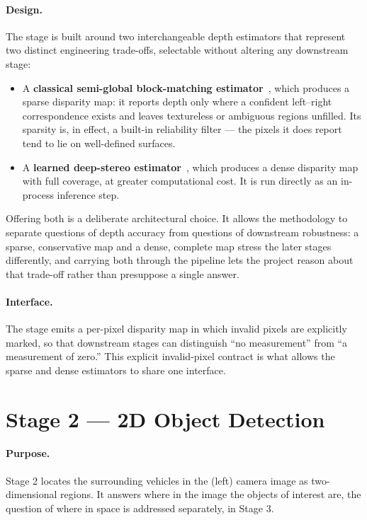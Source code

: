 \paragraph{Design.} The stage is built around two interchangeable depth estimators
that represent two distinct engineering trade-offs, selectable without altering any
downstream stage:

\begin{itemize}[leftmargin=*,itemsep=3pt]
  \item A \textbf{classical semi-global block-matching estimator}~\cite{hirschmuller2008},
  which produces a sparse disparity map: it reports depth only where a
  confident left--right correspondence exists and leaves textureless or ambiguous
  regions unfilled. Its sparsity is, in effect, a built-in reliability filter ---
  the pixels it does report tend to lie on well-defined surfaces.
  \item A \textbf{learned deep-stereo estimator}~\cite{wang2026}, which
  produces a dense disparity map with full coverage, at greater
  computational cost. It is run directly as an in-process inference step.
\end{itemize}

Offering both is a deliberate architectural choice. It allows the methodology to
separate questions of depth accuracy from questions of downstream
robustness: a sparse, conservative map and a dense, complete map stress the later
stages differently, and carrying both through the pipeline lets the project reason
about that trade-off rather than presuppose a single answer.

\paragraph{Interface.} The stage emits a per-pixel disparity map in which invalid
pixels are explicitly marked, so that downstream stages can distinguish ``no
measurement'' from ``a measurement of zero.'' This explicit invalid-pixel contract
is what allows the sparse and dense estimators to share one interface.

\section{Stage 2 --- 2D Object Detection}
\label{sec:stage2}

\paragraph{Purpose.} Stage 2 locates the surrounding vehicles in the (left) camera
image as two-dimensional regions. It answers where in the image the objects
of interest are, the question of where in space is addressed separately, in Stage 3.

